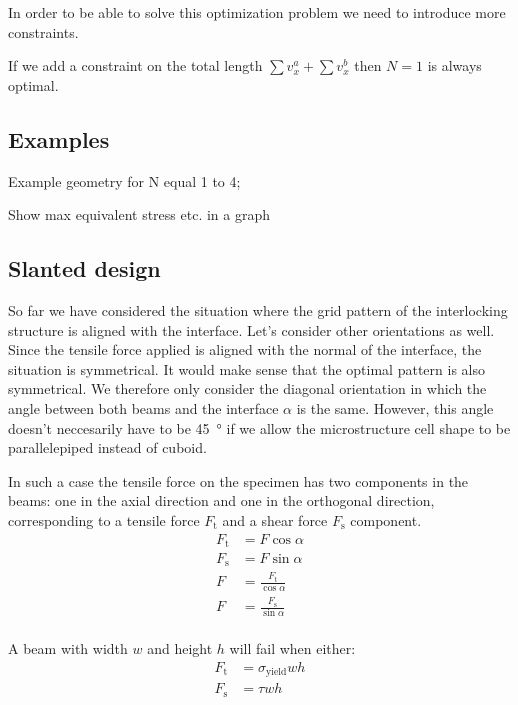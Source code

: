 In order to be able to solve this optimization problem we need to introduce more constraints.

If we add a constraint on the total length $\sum v^a_x + \sum v^b_x$ then $N=1$ is always optimal.











\subsection{Examples}
Example geometry for N equal 1 to 4;

Show max equivalent stress etc. in a graph












\subsection{Slanted design}
So far we have considered the situation where the grid pattern of the interlocking structure is aligned with the interface.
Let's consider other orientations as well.
Since the tensile force applied is aligned with the normal of the interface, the situation is symmetrical.
It would make sense that the optimal pattern is also symmetrical.
We therefore only consider the diagonal orientation in which the angle between both beams and the interface $\alpha$ is the same.
However, this angle doesn't neccesarily have to be \SI{45}{\degree} if we allow the microstructure cell shape to be parallelepiped instead of cuboid.

In such a case the tensile force on the specimen has two components in the beams:
one in the axial direction and one in the orthogonal direction,
corresponding to a tensile force $F_\text{t}$ and a shear force  $F_\text{s}$ component.
\begin{align}
	F_\text{t} &= F \cos \alpha \\
	F_\text{s} &= F \sin \alpha \\
	F &= \frac{F_\text{t}}{\cos \alpha} \\
	F &= \frac{F_\text{s}}{\sin \alpha} \\
\end{align}

A beam with width $w$ and height $h$ will fail when either:
\begin{align}
	F_\text{t} &= \sigma_\text{yield} w h \\
	F_\text{s} &= \tau w h 
\end{align}


